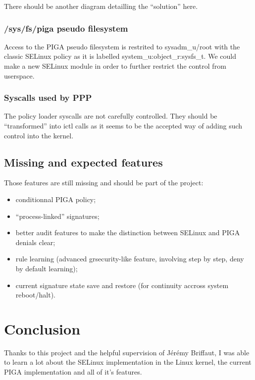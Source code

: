 \documentclass[pdftex,a4paper,titlepage,11pt]{article}
\begin{document}
\bigskip

There should be another diagram detailling the ``solution'' here.

\subsubsection{/sys/fs/piga pseudo filesystem}

Access to the PIGA pseudo filesystem is restrited to sysadm\_u/root with the
classic SELinux policy as it is labelled system\_u:object\_r:sysfs\_t. We could
make a new SELinux module in order to further restrict the control from
userspace.

\subsubsection{Syscalls used by PPP}

The policy loader syscalls are not carefully controlled. They should be
``transformed'' into ictl calls as it seems to be the accepted way of adding
such control into the kernel.

\subsection{Missing and expected features}

Those features are still missing and should be part of the project:

\begin{itemize}
	\item conditionnal PIGA policy;
	\item ``process-linked'' signatures;
	\item better audit features to make the distinction between SELinux and PIGA
denials clear;
	\item rule learning (advanced grsecurity-like feature, involving step by
step, deny by default learning);
	\item current signature state save and restore (for continuity accross
system reboot/halt).
\end{itemize}

\newpage

\section*{Conclusion} 

Thanks to this project and the helpful supervision of Jérémy Briffaut, I was
able to learn a lot about the SELinux implementation in the Linux kernel, the
current PIGA implementation and all of it's features.
\end{document}
